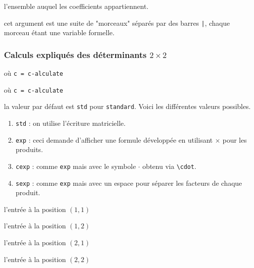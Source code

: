 \documentclass[12pt,a4paper]{article}
\newcommand\env[1]{\texttt{#1}}
\newcommand\macro[1]{\env{\textbackslash{}#1}}
\theoremstyle{definition}
\newcommand\extraspace{
	\vspace{0.25em}
}
\newcommand\mwhyprefix[2]{%
	\texttt{#1 = #1-#2}%
}
\begin{document}
\extraspace



 l'ensemble auquel les coefficients appartiennent.

 cet argument est une suite de "morceaux" séparés par des barres \verb+|+, chaque morceau étant une variable formelle.
\subsubsection{\texorpdfstring{Calculs expliqués des déterminants $2 \times 2$}%
                          {Calculs expliqués des déterminants 3x3}}

  où \quad \mwhyprefix{c}{alculate}

  où \quad \mwhyprefix{c}{alculate}

\IDoption{} la valeur par défaut est \verb+std+ pour \verb+standard+. Voici les différentes valeurs possibles.
\begin{enumerate}
	\item \verb+std+ : on utilise l'écriture matricielle.

	\item \verb+exp+ : ceci demande d'afficher une formule développée en utilisant $\times$ pour les produits.

	\item \verb+cexp+ : comme \verb+exp+ mais avec le symbole $\cdot$ obtenu via \macro{cdot}.

	\item \verb+sexp+ : comme \verb+exp+ mais avec un espace pour séparer les facteurs de chaque produit.
\end{enumerate}

 l'entrée à la position $(1, 1)$

 l'entrée à la position $(1, 2)$

\extraspace

 l'entrée à la position $(2, 1)$

 l'entrée à la position $(2, 2)$                   
\end{document}
